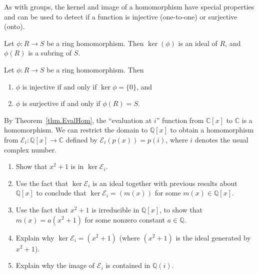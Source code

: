 As with groups, the kernel and image of a homomorphism have special properties and can be used to detect if a function is injective (one-to-one) or surjective (onto).

\begin{theorem}
Let $\phi:R\to S$ be a ring homomorphism. Then $\ker(\phi)$ is an ideal of $R$, and $\phi(R)$ is a subring of $S$.
\end{theorem}

\begin{theorem}\label{thm.HomInjectiveSurjective}
Let $\phi:R\to S$ be a ring homomorphism. Then
\begin{enumerate}
\item $\phi$ is injective if and only if $\ker \phi = \{0\}$, and 
\item $\phi$ is surjective if and only if $\phi(R) = S$.
\end{enumerate}
\end{theorem}

\begin{problem}\label{prob.EvalAtI}
By Theorem~\ref{thm.EvalHom}, the ``evaluation at $i$'' function from $\mathbb{C}[x]$ to  $\mathbb{C}$ is a homomorphism.  We can restrict the domain to $\mathbb{Q}[x]$ to obtain a homomorphism from $\mathcal{E}_{i}:\mathbb{Q}[x]\rightarrow\mathbb{C}$ defined by $\mathcal{E}_{i}(p(x)) = p(i)$, where $i$ denotes the usual complex number.
\begin{enumerate}
\item Show that $x^2+1$ is in $\ker \mathcal{E}_{i}$.
\item Use the fact that $\ker \mathcal{E}_{i}$ is an ideal together with previous results about $\mathbb{Q}[x]$ to conclude that $\ker \mathcal{E}_{i} = (m(x))$ for some $m(x)\in \mathbb{Q}[x]$.
\item Use the fact that $x^2+1$ is irreducible in $\mathbb{Q}[x]$, to show that $m(x) = a(x^2+1)$ for some nonzero constant $a\in \mathbb{Q}$.
\item Explain why $\ker \mathcal{E}_{i} = (x^2 + 1)$ (where $(x^2 + 1)$ is the ideal generated by $x^2 + 1$).
\item Explain why the image of $\mathcal{E}_{i}$ is contained in $\mathbb{Q}(i)$.
\end{enumerate}
\end{problem}

